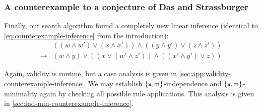 \documentclass[a4paper, UKenglish, cleveref]{lipics-v2019}
\begin{document}

\subsubsection{A counterexample to a conjecture of Das and Strassburger}
\label{sec:counterexample-inference}
Finally, our search algorithm found a completely new linear inference
(identical to \eqref{eq:counterexample-inference} from the introduction):
\begin{equation}
\label{eq:counterexample-inference-repeated}
\begin{array}{rl}
& ((w \land w') \lor (x \land x')) \land ((y \land y') \lor (z \land z')) \\
\to & (w \land y) \lor ((x \lor (w'\land z')) \land ((x'\land y') \lor z) )
\end{array}
\end{equation}


Again, validity is routine, but a case analysis is given in \cref{sec:app:validity-counterexample-inference}.
We may establish $\{\mathsf{s},\mathsf{m} \}$-independence and $\{\mathsf{s},\mathsf{m} \}$-minimality again by checking all possible rule applications.
This analysis is given in \cref{sec:ind-min-counterexample-inference}.
\end{document}
